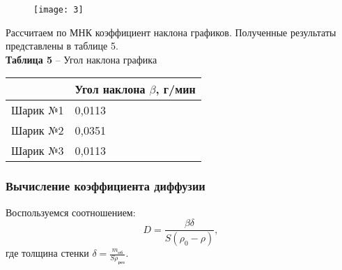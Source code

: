 \documentclass[12pt,a4paper]{article}
\begin{document}
        \begin{figure}[h!]
        	\begin{center}
        		\texttt{[image: 3]}\\
            	{\scriptsize
            	\begin{center}
            	\hspace{69pt}{Рисунок 4 -- График зависимости массы шарика с грузом от времени в 3 измерении}
        	\end{center}}
        	\end{center}
            \label{scheme1}
        \end{figure}

        \begin{table}[!h]
        \begin{flushleft}
        Рассчитаем по МНК коэффициент наклона графиков. Полученные результаты представлены в таблице 5.\\
       		\hspace{140}\textbf{Таблица 5} -- Угол наклона графика \\
        \end{flushleft}
             \begin{center}
                \begin{tabular}{ | l | l |}
                \hline
                           &   Угол наклона $\beta$, г/мин\\
                \hline
                Шарик №1    &    0,0113      \\
                \hline
                Шарик №2    &    0,0351      \\
                \hline
                Шарик №3    &    0,0113      \\
                \hline
                \end{tabular}
            \end{center}
        \end{table}
       
        \newpage
        \subsubsection{Вычисление коэффициента диффузии}
        Воспользуемся соотношением:
            \[
            D = \frac{\beta \delta}{S(\rho_0 - \rho)},
            \]
        где толщина стенки $\delta = \frac{m_\text{об}}{S\rho_\text{рез}}$.\\        
       
\end{document}
